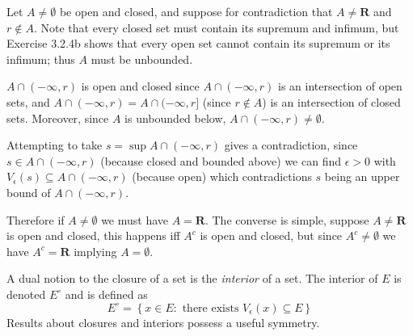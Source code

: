 \begin{solution}
  Let $A \ne \emptyset$ be open and closed, and suppose for contradiction that $A \ne \mathbf R$ and $r \notin A$. Note that every closed set must contain its supremum and infimum, but Exercise 3.2.4b shows that every open set cannot contain its supremum or its infimum; thus \(A\) must be unbounded.

  $A \cap (-\infty, r)$ is open and closed since $A \cap (-\infty, r)$ is an intersection of open sets, and $A \cap (-\infty, r) = A \cap (-\infty, r]$ (since $r \notin A$) is an intersection of closed sets. Moreover, since \(A\) is unbounded below, \(A \cap (-\infty, r) \ne \emptyset\).

  Attempting to take $s = \sup A \cap (-\infty, r)$ gives a contradiction, since $s \in A \cap (-\infty, r)$ (because closed and bounded above) we can find $\epsilon > 0$ with $V_\epsilon(s) \subseteq A \cap (-\infty, r)$ (because open) which contradictions $s$ being an upper bound of $A \cap (-\infty, r)$.

  Therefore if $A \ne \emptyset$ we must have $A = \mathbf{R}$. The converse is simple, suppose $A \ne \mathbf{R}$ is open and closed, this happens iff $A^c$ is open and closed, but since $A^c \ne \emptyset$ we have $A^c = \mathbf{R}$ implying $A = \emptyset$.
\end{solution}

\begin{exercise}
  A dual notion to the closure of a set is the \emph{interior} of a set. The interior of $E$ is denoted $E^{\circ}$ and is defined as
  $$
  E^{\circ}=\left\{x \in E: \text { there exists } V_{\epsilon}(x) \subseteq E\right\}
  $$
  Results about closures and interiors possess a useful symmetry.
\end{exercise}

